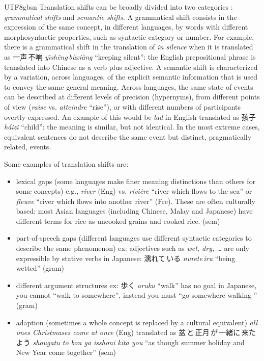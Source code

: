 \documentclass[12pt]{book} %
\newcommand{\eng}[1]{\textit{#1}}
\newcommand{\cmn}[1]{\textit{#1}}
\newcommand{\fre}[1]{\textit{#1}}
\newcommand{\jpn}[1]{\textit{#1}}
\newcommand{\ja}[1]{\CJKfamily{min}#1\CJKfamily{gbsn}}
\begin{document}
\begin{CJK}{UTF8}{gbsn}
Translation shifts can be broadly divided into two categories
\citep{Pado:Erk:2010}: \emph{grammatical shifts} and
\emph{semantic shifts}.  A grammatical shift consists in the
expression of the same concept, in different languages, by words with
different morphosyntactic properties, such as syntactic category or
number.  For example, there is a grammatical shift in the translation
of \eng{in silence} when it is translated
as 一声\,不响 \cmn{y\={\i}sh\={e}ng\,b\`{u}xi\`{a}ng} ``keeping
silent'': the English prepositional phrase is translated into Chinese
as a verb plus adjective.  A semantic shift is characterized by a
variation, across languages, of the explicit semantic information that
is used to convey the same general meaning.  Across languages, the
same state of events can be described at different levels of precision
(hypernyms), from different points of view (\eng{raise}
vs. \fre{atteindre} ``rise''), or with different numbers of participants
overtly expressed.  An example of this would be \eng{lad} in English
translated as 孩子 \cmn{h\'{a}izi} ``child'': the meaning is similar,
but not identical. In the most extreme cases, equivalent sentences do
not describe the same event but distinct, pragmatically related,
events.  %

Some examples of translation shifts are:
\begin{itemize}
\item lexical gaps (some languages make finer meaning distinctions than others for some concepts)
e.g.,  \eng{river} (Eng) vs. \fre{rivi\`{e}re} ``river which flows to the sea'' or \fre{fleuve} ``river which flows into another river'' (Fre).  These are often culturally based: most Asian languages (including Chinese, Malay and Japanese) have different terms for rice as uncooked grains and cooked rice. (sem)
\item part-of-speech gaps (different languages use different syntactic categories to describe the same phenomenon)
ex: adjectives such as \eng{wet, dry, \ldots} are only expressible by stative
verbs in Japanese: \ja{濡れて\,いる} \jpn{nurete\,iru} ``being wetted'' (gram)
\item different argument structures ex: \ja{歩く} \jpn{aruku} ``walk'' has
no goal in Japanese, you cannot ``walk to somewhere'', instead you
must ``go somewhere walking '' (gram)
\item adaption (sometimes a whole concept is replaced by a cultural
  equivalent) \eng{all ones Christmases come at once} (Eng) translated
  as \ja{盆\,と\,正月\,が\,一緒に\,来た\,よう} \jpn{shougatu to bon ga isshoni
    kita you} ``as though summer holiday and New Year come together''
  (sem)


\end{itemize}
\end{CJK}
\end{document}
